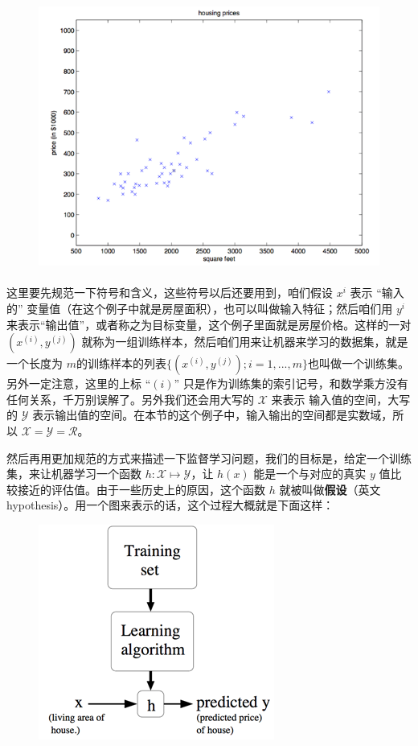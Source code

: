 \documentclass[UTF8]{ctexart}
\begin{document}
	\begin{figure}[h]
		\centering
		\includegraphics{images/screenshot002}
	\end{figure}
	
	\paragraph{}
		这里要先规范一下符号和含义，这些符号以后还要用到，咱们假设 $x^{i}$ 表示 “输入的” 变量值（在这个例子中就是房屋面积），也可以叫做输入特征；然后咱们用 $y^{i}$ 来表示“输出值”，或者称之为目标变量，这个例子里面就是房屋价格。这样的一对 $(x^{(i)},y^{(j)})$ 就称为一组训练样本，然后咱们用来让机器来学习的数据集，就是一个长度为 $m$的训练样本的列表$\{(x^{(i)},y^{(j)});i=1,...,m\}$也叫做一个训练集。另外一定注意，这里的上标 “$(i)$” 只是作为训练集的索引记号，和数学乘方没有任何关系，千万别误解了。另外我们还会用大写的 $ \mathcal{X} $ 来表示 输入值的空间，大写的 $ \mathcal{Y} $ 表示输出值的空间。在本节的这个例子中，输入输出的空间都是实数域，所以 $ \mathcal{X = Y = R} $。
	
		然后再用更加规范的方式来描述一下监督学习问题，我们的目标是，给定一个训练集，来让机器学习一个函数 $ h: \mathcal{X} \mapsto \mathcal{Y} $，让 $ h(x) $ 能是一个与对应的真实 $ y $ 值比较接近的评估值。由于一些历史上的原因，这个函数 $ h $ 就被叫做\textbf{假设}（英文hypothesis）。用一个图来表示的话，这个过程大概就是下面这样：
	
	\begin{figure}[h]
		\centering
		\includegraphics{images/screenshot003}
	\end{figure}
	
\end{document}

